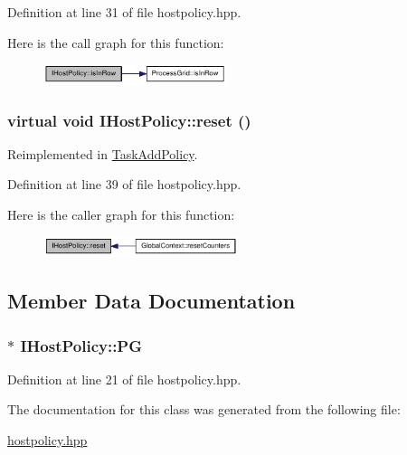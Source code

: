 Definition at line 31 of file hostpolicy.hpp.

Here is the call graph for this function:\nopagebreak
\begin{figure}[H]
\begin{center}
\leavevmode
\includegraphics[width=152pt]{class_i_host_policy_aed5e7b81736d6e950897a8e341cc9a2c_cgraph}
\end{center}
\end{figure}
\hypertarget{class_i_host_policy_a76602bc70073ed8eb476d9ddacdef74f}{
\subsubsection[{reset}]{\setlength{\rightskip}{0pt plus 5cm}virtual void IHostPolicy::reset ()}}
\label{class_i_host_policy_a76602bc70073ed8eb476d9ddacdef74f}


Reimplemented in \hyperlink{class_task_add_policy_a5ce62af8541c3e3001d5b373799c1228}{TaskAddPolicy}.

Definition at line 39 of file hostpolicy.hpp.

Here is the caller graph for this function:\nopagebreak
\begin{figure}[H]
\begin{center}
\leavevmode
\includegraphics[width=161pt]{class_i_host_policy_a76602bc70073ed8eb476d9ddacdef74f_icgraph}
\end{center}
\end{figure}


\subsection{Member Data Documentation}
\hypertarget{class_i_host_policy_a8e93dcd6f13d6ad65da75ddf2837174f}{
\subsubsection[{PG}]{$\ast$ {\bf IHostPolicy::PG}}}
\label{class_i_host_policy_a8e93dcd6f13d6ad65da75ddf2837174f}


Definition at line 21 of file hostpolicy.hpp.

The documentation for this class was generated from the following file:\begin{DoxyCompactItemize}
\item 
\hyperlink{hostpolicy_8hpp}{hostpolicy.hpp}\end{DoxyCompactItemize}
